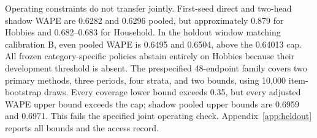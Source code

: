Operating constraints do not transfer jointly. First-seed direct and two-head shadow WAPE are 0.6282 and 0.6296 pooled, but approximately 0.879 for Hobbies and 0.682--0.683 for Household. In the holdout window matching calibration B, even pooled WAPE is 0.6495 and 0.6504, above the 0.64013 cap. All frozen category-specific policies abstain entirely on Hobbies because their development threshold is absent. The prespecified 48-endpoint family covers two primary methods, three periods, four strata, and two bounds, using 10,000 item-bootstrap draws. Every coverage lower bound exceeds 0.35, but every adjusted WAPE upper bound exceeds the cap; shadow pooled upper bounds are 0.6959 and 0.6971. This fails the specified joint operating check. Appendix~\ref{app:heldout} reports all bounds and the access record.

